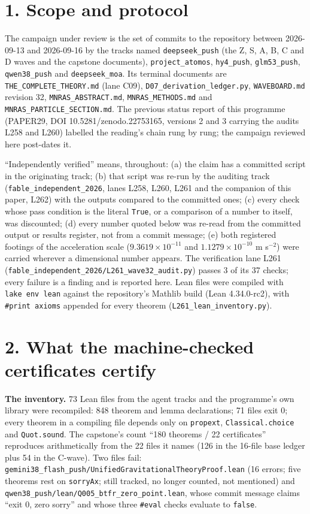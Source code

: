 \documentclass[
  11pt,
]{article}
\begin{document}
\section{1. Scope and protocol}\label{scope-and-protocol}

The campaign under review is the set of commits to the repository
between 2026-09-13 and 2026-09-16 by the tracks named
\texttt{deepseek\_push} (the Z, S, A, B, C and D waves and the capstone
documents), \texttt{project\_atomos}, \texttt{hy4\_push},
\texttt{glm53\_push}, \texttt{qwen38\_push} and \texttt{deepseek\_moa}.
Its terminal documents are \texttt{THE\_COMPLETE\_THEORY.md} (lane C09),
\texttt{D07\_derivation\_ledger.py}, \texttt{WAVEBOARD.md} revision 32,
\texttt{MNRAS\_ABSTRACT.md}, \texttt{MNRAS\_METHODS.md} and
\texttt{MNRAS\_PARTICLE\_SECTION.md}. The previous status report of this
programme (PAPER29, DOI 10.5281/zenodo.22753165, versions 2 and 3
carrying the audits L258 and L260) labelled the reading's chain rung by
rung; the campaign reviewed here post-dates it.

``Independently verified'' means, throughout: (a) the claim has a
committed script in the originating track; (b) that script was re-run by
the auditing track (\texttt{fable\_independent\_2026}, lanes L258, L260,
L261 and the companion of this paper, L262) with the outputs compared to
the committed ones; (c) every check whose pass condition is the literal
\texttt{True}, or a comparison of a number to itself, was discounted;
(d) every number quoted below was re-read from the committed output or
results register, not from a commit message; (e) both registered
footings of the acceleration scale (\(9.3619\times10^{-11}\) and
\(1.1279\times10^{-10}\) m s\(^{-2}\)) were carried wherever a
dimensional number appears. The verification lane L261
(\texttt{fable\_independent\_2026/L261\_wave32\_audit.py}) passes 3 of
its 37 checks; every failure is a finding and is reported here. Lean
files were compiled with \texttt{lake\ env\ lean} against the
repository's Mathlib build (Lean 4.34.0-rc2), with
\texttt{\#print\ axioms} appended for every theorem
(\texttt{L261\_lean\_inventory.py}).

\section{2. What the machine-checked certificates
certify}\label{what-the-machine-checked-certificates-certify}

\textbf{The inventory.} 73 Lean files from the agent tracks and the
programme's own library were recompiled: 848 theorem and lemma
declarations; 71 files exit 0; every theorem in a compiling file depends
only on \texttt{propext}, \texttt{Classical.choice} and
\texttt{Quot.sound}. The capstone's count ``180 theorems / 22
certificates'' reproduces arithmetically from the 22 files it names (126
in the 16-file base ledger plus 54 in the C-wave). Two files fail:
\texttt{gemini38\_flash\_push/UnifiedGravitationalTheoryProof.lean} (16
errors; five theorems rest on \texttt{sorryAx}; still tracked, no longer
counted, not mentioned) and
\texttt{qwen38\_push/lean/Q005\_btfr\_zero\_point.lean}, whose commit
message claims ``exit 0, zero sorry'' and whose three \texttt{\#eval}
checks evaluate to \texttt{false}.
\end{document}
